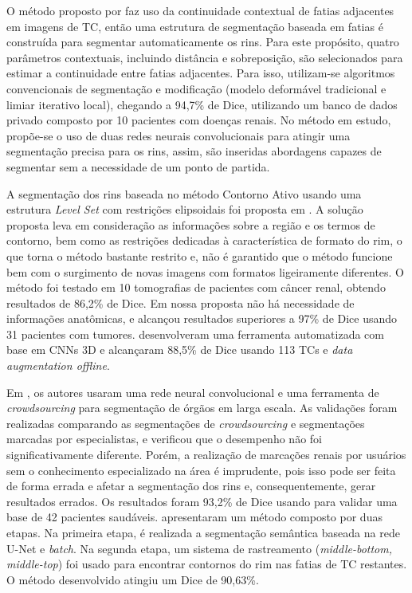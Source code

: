 O método proposto por  faz uso da continuidade contextual de fatias adjacentes em imagens de TC, então uma estrutura de segmentação baseada em fatias é construída para segmentar automaticamente os rins. Para este propósito, quatro parâmetros contextuais, incluindo distância e sobreposição, são selecionados para estimar a continuidade entre fatias adjacentes. Para isso, utilizam-se algoritmos convencionais de segmentação e modificação (modelo deformável tradicional e limiar iterativo local), chegando a 94,7\% de Dice, utilizando um banco de dados privado composto por 10 pacientes com doenças renais. No método em estudo, propõe-se o uso de duas redes neurais convolucionais para atingir uma segmentação precisa para os rins, assim, são inseridas abordagens capazes de segmentar sem a necessidade de um ponto de partida.

A segmentação dos rins baseada no método Contorno Ativo usando uma estrutura \textit{Level Set} com restrições elipsoidais foi proposta em . A solução proposta leva em consideração as informações sobre a região e os termos de contorno, bem como as restrições dedicadas à característica de formato do rim, o que torna o método bastante restrito e, não é garantido que o método funcione bem com o surgimento de novas imagens com formatos ligeiramente diferentes. O método foi testado em 10 tomografias de pacientes com câncer renal, obtendo resultados de 86,2\% de Dice. Em nossa proposta não há necessidade de informações anatômicas, e alcançou resultados superiores a 97\% de Dice usando 31 pacientes com tumores.  desenvolveram uma ferramenta automatizada com base em CNNs 3D e alcançaram 88,5\% de Dice usando 113 TCs e \textit{data augmentation offline}.

Em , os autores usaram uma rede neural convolucional e uma ferramenta de \textit{crowdsourcing} para segmentação de órgãos em larga escala. As validações foram realizadas comparando as segmentações de \textit{crowdsourcing} e segmentações marcadas por especialistas, e verificou que o desempenho não foi significativamente diferente. Porém, a realização de marcações renais por usuários sem o conhecimento especializado na área é imprudente, pois isso pode ser feita de forma errada e afetar a segmentação dos rins e, consequentemente, gerar resultados errados. Os resultados foram 93,2\% de Dice usando para validar uma base de 42 pacientes saudáveis.  apresentaram um método composto por duas etapas. Na primeira etapa, é realizada a segmentação semântica baseada na rede U-Net e \textit{batch}. Na segunda etapa, um sistema de rastreamento (\textit{middle-bottom, middle-top}) foi usado para encontrar contornos do rim nas fatias de TC restantes. O método desenvolvido atingiu um Dice de 90,63\%.

